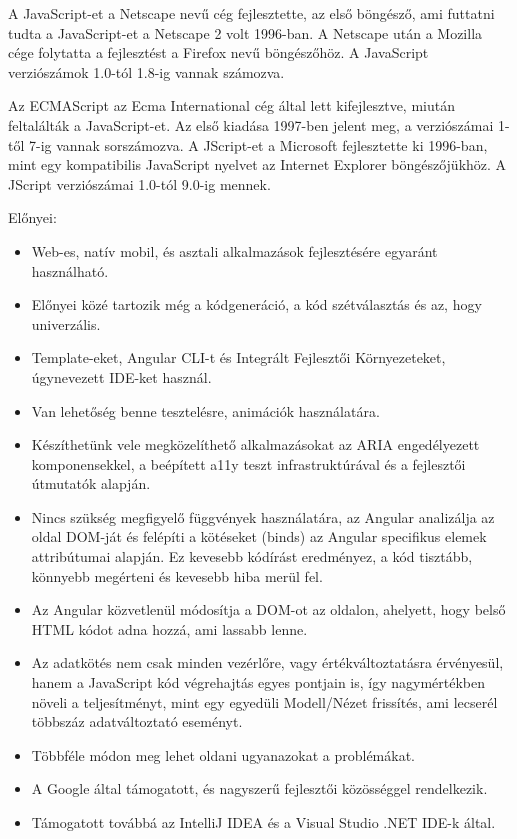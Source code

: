 A JavaScript-et a Netscape nevű cég fejlesztette, az első böngésző, ami futtatni tudta a JavaScript-et a Netscape 2 volt 1996-ban. A Netscape után a Mozilla cége folytatta a fejlesztést a Firefox nevű böngészőhöz. A JavaScript verziószámok 1.0-tól 1.8-ig vannak számozva.

Az ECMAScript az Ecma International cég által lett kifejlesztve, miután feltalálták a JavaScript-et. Az első kiadása 1997-ben jelent meg, a verziószámai 1-től 7-ig vannak sorszámozva.
A JScript-et a Microsoft fejlesztette ki 1996-ban, mint egy kompatibilis JavaScript nyelvet az Internet Explorer böngészőjükhöz. A JScript verziószámai 1.0-tól 9.0-ig mennek.


Előnyei:

\begin{itemize}
\item Web-es, natív mobil, és asztali alkalmazások fejlesztésére egyaránt használható.
\item Előnyei közé tartozik még a kódgeneráció, a kód szétválasztás és az, hogy univerzális.
\item Template-eket, Angular CLI-t és Integrált Fejlesztői Környezeteket, úgynevezett IDE-ket használ.
\item Van lehetőség benne tesztelésre, animációk használatára. 
\item Készíthetünk vele megközelíthető alkalmazásokat az ARIA engedélyezett komponensekkel, a beépített a11y teszt infrastruktúrával és a fejlesztői útmutatók alapján.
\item Nincs szükség megfigyelő függvények használatára, az Angular analizálja az oldal DOM-ját és felépíti a kötéseket (binds) az Angular specifikus elemek attribútumai alapján. Ez kevesebb kódírást eredményez, a kód tisztább, könnyebb megérteni és kevesebb hiba merül fel.
\item Az Angular közvetlenül módosítja a DOM-ot az oldalon, ahelyett, hogy belső HTML kódot adna hozzá, ami lassabb lenne.
\item Az adatkötés nem csak minden vezérlőre, vagy értékváltoztatásra érvényesül, hanem a JavaScript kód végrehajtás egyes pontjain is, így nagymértékben növeli a teljesítményt, mint egy egyedüli Modell/Nézet frissítés, ami lecserél többszáz adatváltoztató eseményt.
\item Többféle módon meg lehet oldani ugyanazokat a problémákat.
\item A Google által támogatott, és nagyszerű fejlesztői közösséggel rendelkezik.
\item Támogatott továbbá az IntelliJ IDEA és a Visual Studio .NET IDE-k által.
\end{itemize}

